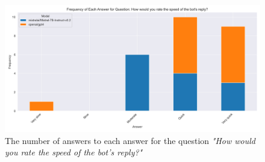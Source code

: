 \begin{figure}[H]
    \centering
    \includegraphics[width=\textwidth]{results/plots/assets/feedback-02-frequency-of-answer-for-question-per-model-cbfea1.png}
    \caption{The number of answers to each answer for the question \textit{"How would you rate the speed of the bot's reply?"}}
    \label{fig:feedback_02_frequency_of_answer_for_question_per_model_cbfea1}
\end{figure}